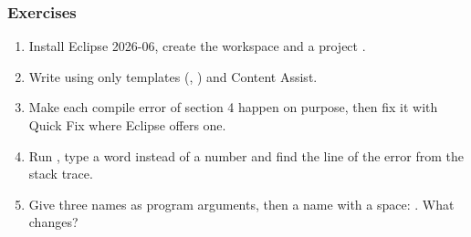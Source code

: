 \documentclass[aspectratio=169,10pt,compress]{beamer}
\begin{document}
\begin{frame}[t,fragile] \frametitle{Exercises}
  \begin{enumerate}\small
    \item Install Eclipse 2026-06, create the workspace  and a project .
    \item Write  using only templates (, ) and Content Assist.
    \item Make each compile error of section 4 happen on purpose, then fix it with Quick Fix where Eclipse offers one.
    \item Run , type a word instead of a number and find the line of the error from the stack trace.
    \item Give  three names as program arguments, then a name with a space: . What changes?
  \end{enumerate}
\end{frame}




\begin{frame}[t,fragile]
	\begin{center}
		\vspace{4cm}
	\end{center}
\end{frame}
\end{document}
